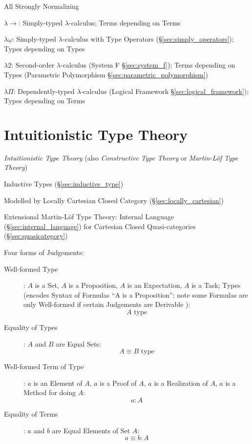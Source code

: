 All Strongly Normalizing

$\lambda\rightarrow$: Simply-typed $\lambda$-calculus; Terms depending
on Terms

$\lambda\underline{\omega}$: Simply-typed $\lambda$-calculus with Type
Operators (\S\ref{sec:simply_operators}); Types depending on Types

$\lambda2$: Second-order $\lambda$-calculus (System F
\S\ref{sec:system_f}); Terms depending on Types (Parametric
Polymorphism \S\ref{sec:parametric_polymorphism})

$\lambda\Pi$: Dependently-typed $\lambda$-calculus
(Logical Framework \S\ref{sec:logical_framework}); Types depending on
Terms



\section{Intuitionistic Type Theory}\label{sec:intuitionistic_type}
\cite{martinlof84}

\emph{Intuitionistic Type Theory} (also \emph{Constructive Type
  Theory} or \emph{Martin-L\"of Type Theory})

Inductive Types (\S\ref{sec:inductive_type})

Modelled by Locally Cartesian Closed Category
(\S\ref{sec:locally_cartesian})

Extensional Martin-L\"of Type Theory: Internal Language
(\S\ref{sec:internal_language}) for Cartesian Closed Quasi-categories
(\S\ref{sec:quasicategory})

Four forms of Judgements:
\begin{description}
  \item [Well-formed Type]: $A$ is a Set, $A$ is a Proposition, $A$ is
    an Expectation, $A$ is a Task; Types (encodes Syntax of Formulas
    ``A is a Proposition''; note some Formulas are only Well-formed if
    certain Judgements are Derivable \cite{thompson99}):
    \[
      A \text{ type}
    \]
  \item [Equality of Types]: $A$ and $B$ are Equal Sets:
    \[
      A \equiv B \text{ type}
    \]
  \item [Well-formed Term of Type]: $a$ is an Element of $A$, $a$ is a
    Proof of $A$, $a$ is a Realization of $A$, $a$ is a Method for
    doing $A$:
    \[
      a : A
    \]
  \item [Equality of Terms]: $a$ and $b$ are Equal Elements of Set $A$:
    \[
      a \equiv b : A
    \]
\end{description}

